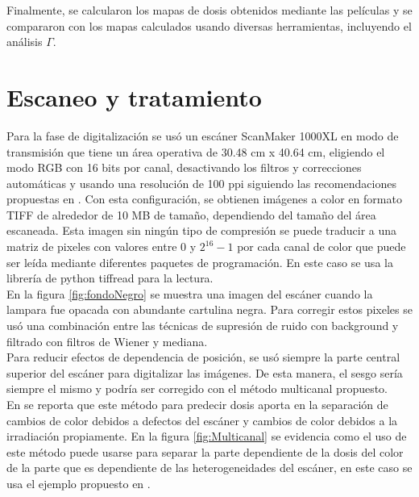 Finalmente, se calcularon los mapas de dosis obtenidos mediante las películas y se compararon con los mapas calculados usando diversas herramientas, incluyendo el análisis $\Gamma$.

\section{Escaneo y tratamiento}
Para la fase de digitalización se usó un escáner ScanMaker 1000XL en modo de transmisión que tiene un área operativa de 30.48 cm x 40.64 cm, eligiendo el modo RGB con 16 bits por canal, desactivando los filtros y correcciones automáticas y usando una resolución de 100 ppi siguiendo las recomendaciones propuestas en \cite{Devic2016}. Con esta configuración, se obtienen imágenes a color en formato TIFF de alrededor de 10 MB de tamaño, dependiendo del tamaño del área escaneada. Esta imagen sin ningún tipo de compresión se puede traducir a una matriz de pixeles con valores entre $0$ y $2^{16}-1$ por cada canal de color que puede ser leída mediante diferentes paquetes de programación. En este caso se usa la librería de python tiffread para la lectura. \\



En la figura \ref{fig:fondoNegro} se muestra una imagen del escáner cuando la lampara fue opacada con abundante cartulina negra. Para corregir estos pixeles se usó una combinación entre las técnicas de supresión de ruido con background y filtrado con filtros de Wiener y mediana. \\

Para reducir efectos de dependencia de posición, se usó siempre la parte central superior del escáner para digitalizar las imágenes. De esta manera, el sesgo sería siempre el mismo y podría ser corregido con el método multicanal propuesto.\\

En \cite{Micke2011} se reporta que este método para predecir dosis aporta en la separación de cambios de color debidos a defectos del escáner y cambios de color debidos a la irradiación propiamente. En la figura \ref{fig:Multicanal} se evidencia como el uso de este método puede usarse para separar la parte dependiente de la dosis del color de la parte que es dependiente de las heterogeneidades del escáner, en este caso se usa el ejemplo propuesto en \cite{Micke2011}. \\

